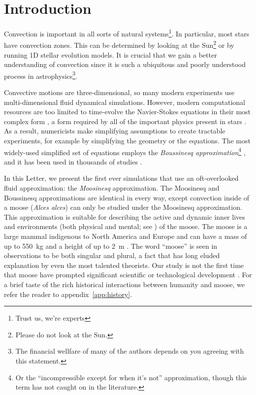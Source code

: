 \section{Introduction}
\label{sec:introduction}

Convection is important in all sorts of natural systems\footnote{Trust us, we're experts}.
In particular, most stars have convection zones.
This can be determined by looking at the Sun\footnote{Please do not look at the Sun.} or by running 1D stellar evolution models.
It is crucial that we gain a better understanding of convection since it is such a ubiquitous and poorly understood process in astrophysics\footnote{The financial wellfare of many of the authors depends on you agreeing with this statement.}.

Convective motions are three-dimensional, so many modern experiments use multi-dimensional fluid dynamical simulations.
However, modern computational resources are too limited to time-evolve the Navier-Stokes equations in their most complex form \citep{landau}, a form required by all of the important physics present in stars \citep{Paxton2011, Paxton2013, Paxton2015, Paxton2018, Paxton2019}.
As a result, numericists make simplifying assumptions to create tractable experiments, for example by simplifying the geometry or the equations.
The most widely-used simplified set of equations employs the \emph{Boussinesq approximation}\footnote{Or the ``incompressible except for when it's not'' approximation, though this term has not caught on in the literature.} \citep{spiegel_veronis_1960}, and it has been used in thousands of studies \citep[see e.g.,][]{ahlers_etal_2009}.

In this Letter, we present the first ever simulations that use an oft-overlooked fluid approximation: the \emph{Moosinesq} approximation.
The Moosinesq and Boussinesq approximations are identical in every way, except convection inside of a moose (\emph{Alces alces}) can only be studied under the Moosinesq approximation.
This approximation is suitable for describing the active and dynamic inner lives and environments (both physical and mental; see \citealp{Gibson2015}) of the moose.
The moose is a large mammal indigenous to North America and Europe and can have a mass of up to 550~kg and a height of up to 2~m \citep{CPWmoose}.
The word ``moose'' is seen in observations to be both singular and plural, a fact that has long eluded explanation by even the most talented theorists.
Our study is not the first time that moose have prompted significant scientific or technological development \citep[see, e.g.,][]{Handel2009}.
For a brief taste of the rich historical interactions between humanity and moose, we refer the reader to appendix~\ref{app:history}.

